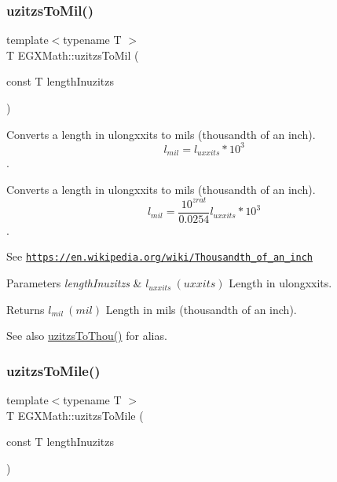 \subsubsection{\texorpdfstring{uzitzs\+To\+Mil()}{uzitzsToMil()}}
{\footnotesize\ttfamily template$<$typename T $>$ \\
T E\+G\+X\+Math\+::uzitzs\+To\+Mil (\begin{DoxyParamCaption}\item[{const T}]{length\+Inuzitzs }\end{DoxyParamCaption})}



Converts a length in ulongxxits to mils (thousandth of an inch). \[ l_{mil}=l_{uxxits} * 10^{3} \]. 

Converts a length in ulongxxits to mils (thousandth of an inch). \[ l_{mil}= \frac{10^{zrat}}{0.0254} l_{uxxits} * 10^{3} \].

See \href{https://en.wikipedia.org/wiki/Thousandth_of_an_inch}{\tt https\+://en.\+wikipedia.\+org/wiki/\+Thousandth\+\_\+of\+\_\+an\+\_\+inch} 
\begin{DoxyParams}{Parameters}
{\em length\+Inuzitzs} & $ l_{uxxits}\ (uxxits)$ Length in ulongxxits. \\
\hline
\end{DoxyParams}
\begin{DoxyReturn}{Returns}
$ l_{mil}\ (mil)$ Length in mils (thousandth of an inch). 
\end{DoxyReturn}
\begin{DoxySeeAlso}{See also}
\mbox{\hyperlink{group___e_g_x_math-_conversions-_length_conversions-uzitzs-_imperial_gaa11694f9026bf30e29bd716a35c05b4e}{uzitzs\+To\+Thou()}} for alias. 
\end{DoxySeeAlso}
\mbox{\label{group___e_g_x_math-_conversions-_length_conversions-uzitzs-_imperial_ga3396c913e6937eee49337db8fac05ca7}} 
\subsubsection{\texorpdfstring{uzitzs\+To\+Mile()}{uzitzsToMile()}}
{\footnotesize\ttfamily template$<$typename T $>$ \\
T E\+G\+X\+Math\+::uzitzs\+To\+Mile (\begin{DoxyParamCaption}\item[{const T}]{length\+Inuzitzs }\end{DoxyParamCaption})}



